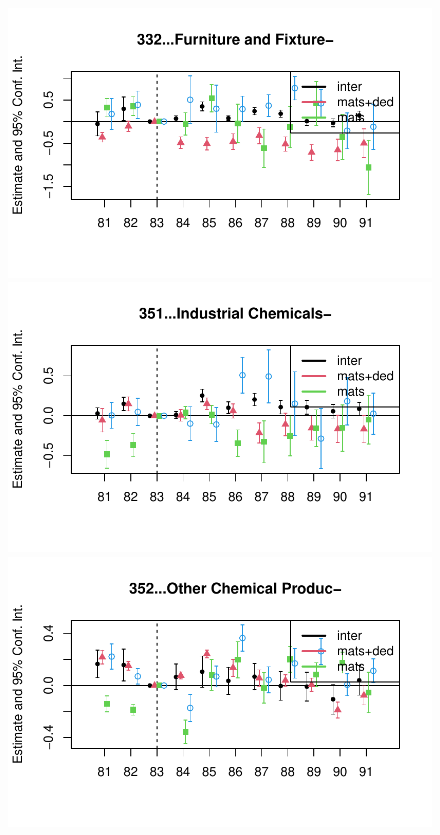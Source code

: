 \documentclass[
  12pt]{article}
\theoremstyle{definition}
\theoremstyle{remark}
\begin{document}
\begin{figure}
\begin{minipage}{\linewidth}
\includegraphics{Tax-Prod_files/figure-pdf/unnamed-chunk-11-13.pdf}

\includegraphics{Tax-Prod_files/figure-pdf/unnamed-chunk-11-14.pdf}

\includegraphics{Tax-Prod_files/figure-pdf/unnamed-chunk-11-15.pdf}


\end{minipage}
\end{figure}
\end{document}
